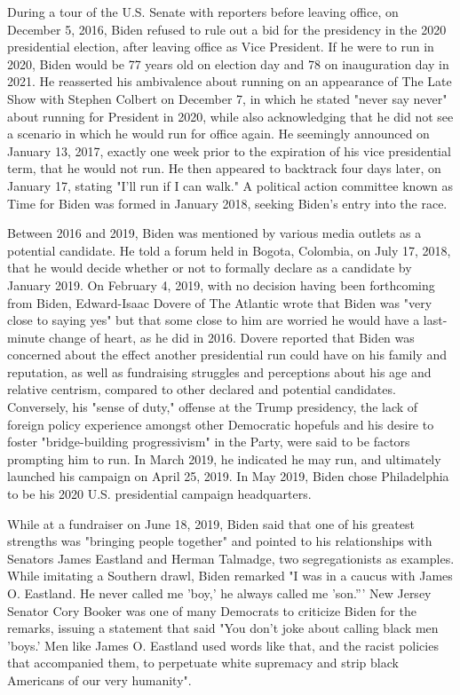 During a tour of the U.S. Senate with reporters before leaving office,
on December 5, 2016, Biden refused to rule out a bid for the presidency
in the 2020 presidential election, after leaving office as Vice
President. If he were to run in 2020, Biden would be 77 years old on
election day and 78 on inauguration day in 2021. He reasserted his
ambivalence about running on an appearance of The Late Show with Stephen
Colbert on December 7, in which he stated "never say never" about
running for President in 2020, while also acknowledging that he did not
see a scenario in which he would run for office again. He seemingly
announced on January 13, 2017, exactly one week prior to the expiration
of his vice presidential term, that he would not run. He then appeared
to backtrack four days later, on January 17, stating "I'll run if I can
walk." A political action committee known as Time for Biden was formed
in January 2018, seeking Biden's entry into the race.

Between 2016 and 2019, Biden was mentioned by various media outlets as a
potential candidate. He told a forum held in Bogota, Colombia, on July
17, 2018, that he would decide whether or not to formally declare as a
candidate by January 2019. On February 4, 2019, with no decision having
been forthcoming from Biden, Edward-Isaac Dovere of The Atlantic wrote
that Biden was "very close to saying yes" but that some close to him are
worried he would have a last-minute change of heart, as he did in 2016.
Dovere reported that Biden was concerned about the effect another
presidential run could have on his family and reputation, as well as
fundraising struggles and perceptions about his age and relative
centrism, compared to other declared and potential candidates.
Conversely, his "sense of duty," offense at the Trump presidency, the
lack of foreign policy experience amongst other Democratic hopefuls and
his desire to foster "bridge-building progressivism" in the Party, were
said to be factors prompting him to run. In March 2019, he indicated he
may run, and ultimately launched his campaign on April 25, 2019. In May
2019, Biden chose Philadelphia to be his 2020 U.S. presidential campaign
headquarters.

While at a fundraiser on June 18, 2019, Biden said that one of his
greatest strengths was "bringing people together" and pointed to his
relationships with Senators James Eastland and Herman Talmadge, two
segregationists as examples. While imitating a Southern drawl, Biden
remarked "I was in a caucus with James O. Eastland. He never called me
'boy,' he always called me 'son.''' New Jersey Senator Cory Booker was
one of many Democrats to criticize Biden for the remarks, issuing a
statement that said "You don't joke about calling black men 'boys.' Men
like James O. Eastland used words like that, and the racist policies
that accompanied them, to perpetuate white supremacy and strip black
Americans of our very humanity".

